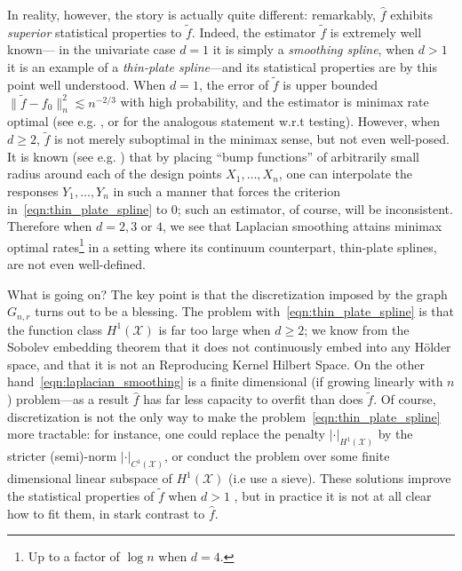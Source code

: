 \documentclass[twoside]{article}
\newcommand{\1}{\mathbf{1}}
\newcommand{\Xset}{\mathcal{X}}
\newcommand{\wt}[1]{\widetilde{#1}}
\newcommand{\wh}[1]{\widehat{#1}}
\theoremstyle{definition}
\theoremstyle{remark}
\begin{document}
In reality, however, the story is actually quite different: remarkably, $\wh{f}$ exhibits \emph{superior} statistical properties to $\wt{f}$. Indeed, the estimator $\wt{f}$ is extremely well known--- in the univariate case $d = 1$ it is simply a \emph{smoothing spline}, when $d > 1$ it is an example of a \emph{thin-plate spline}---and its statistical properties are by this point well understood. When $d = 1$, the error of $\wt{f}$ is upper bounded $\|\wt{f} - f_0\|_n^2 \lesssim n^{-2/3}$ with high probability, and the estimator is minimax rate optimal (see e.g. \cite{vandergeer2000}, or \cite{liu2019} for the analogous statement w.r.t testing). However, when $d \geq 2$, $\wt{f}$ is not merely suboptimal in the minimax sense, but not even well-posed. It is known (see e.g. \cite{green93}) that by placing ``bump functions'' of arbitrarily small radius around each of the design points $X_1,\ldots,X_n$, one can interpolate the responses $Y_1,\ldots,Y_n$ in such a manner that forces the criterion in~\eqref{eqn:thin_plate_spline} to 0; such an estimator, of course, will be inconsistent. Therefore when $d = 2,3$ or $4$, we see that Laplacian smoothing attains minimax optimal rates\footnote{Up to a factor of $\log n$ when $d = 4$.} in a setting where its continuum counterpart, thin-plate splines, are not even well-defined.

What is going on? The key point is that the discretization imposed by the graph $G_{n,r}$ turns out to be a blessing. The problem with~\eqref{eqn:thin_plate_spline} is that the function class $H^1(\Xset)$ is far too large when $d \geq 2$; we know from the Sobolev embedding theorem \cite{evans10} that it does not continuously embed into any H\"{o}lder space, and that it is not an Reproducing Kernel Hilbert Space. On the other hand~\eqref{eqn:laplacian_smoothing} is a finite dimensional (if growing linearly with $n$) problem---as a result $\wh{f}$ has far less capacity to overfit than does $\wt{f}$. Of course, discretization is not the only way to make the problem~\eqref{eqn:thin_plate_spline} more tractable: for instance, one could replace the penalty $|\cdot|_{H^1(\Xset)}$ by the stricter (semi)-norm $|\cdot|_{C^1(\Xset)}$, or conduct the problem over some finite dimensional linear subspace of $H^1(\Xset)$ (i.e use a sieve). These solutions improve the statistical properties of $\wt{f}$ when $d > 1$ \citep{birge1993,birge1998,vandergeer2000}, but in practice it is not at all clear how to fit them, in stark contrast to $\wh{f}$.
\end{document}
